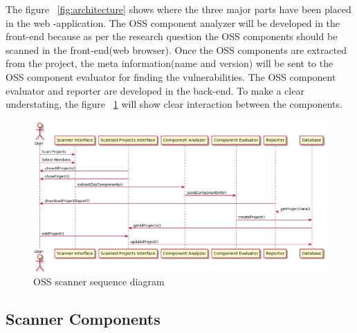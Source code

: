 \newpage
The figure ~\ref{fig:architecture} shows where the three major parts have been placed in the web -application. The \acs{OSS} component analyzer will be developed in the front-end because as per the research question the \acs{OSS} components should be scanned in the front-end(web browser). Once the \acs{OSS} components are extracted from the project, the meta information(name and version) will be sent to the OSS component evaluator for finding the vulnerabilities. The OSS component evaluator and reporter are developed in the back-end. To make a clear understating, the figure ~\ref{fig:sequence} will show clear interaction between the components.
\begin{figure}[h!]
	\includegraphics[width=15cm]{includes/sequence_diagram.png}
	\centering
	\caption{\acs{OSS} scanner sequence diagram}
	\label{fig:sequence}
\end{figure} 
\subsection{Scanner Components}

